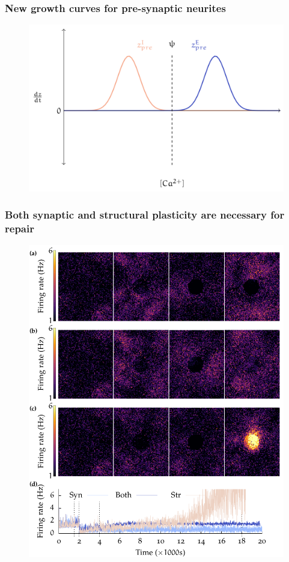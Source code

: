 \begin{frame}[c]
  \frametitle{New growth curves for pre-synaptic neurites}
  \begin{figure}[h]
    \centering
    \includegraphics[width=0.6\linewidth]{99_images/growth-pre}
  \end{figure}
\end{frame}
\begin{frame}[c]
  \frametitle{Both synaptic and structural plasticity are necessary for repair}
  \begin{figure}[h]
    \centering
    \includegraphics[width=0.6\linewidth]{99_images/syn-str-both}
  \end{figure}
\end{frame}

